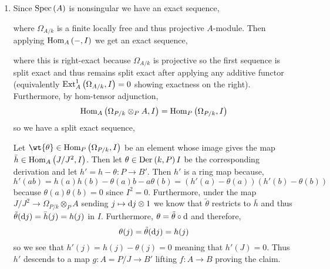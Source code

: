 \documentclass[12pt]{article}
\begin{document}
\begin{enumerate}
\item Since $\mathrm{Spec}\left( A \right)$ is nonsingular we have an exact sequence,
\begin{center}
\end{center}
where $\Omega_{A/k}$ is a finite locally free and thus projective $A$-module.
Then applying $\mathrm{Hom}_{A} \left( -, I \right)$ we get an exact sequence,
\begin{center}
\end{center}
where this is right-exact because $\Omega_{A/k}$ is projective so the first sequence is split exact and thus remains split exact after applying any additive functor (equivalently $\mathrm{Ext}^{1}_{A} \left( \Omega_{A/k}, I \right) = 0$ showing exactness on the right). Furthermore, by hom-tensor adjunction,
\[ \mathrm{Hom}_{A} \left( \Omega_{P/k} \otimes_P A, I \right) = \mathrm{Hom}_{P} \left( \Omega_{P/k}, I \right) \]
so we have a split exact sequence,
\begin{center}
\end{center}
Let $\wt{\theta} \in \Hom{P}{\Omega_{P/k}}{I}$ be an element whose image gives the map $\bar{h} \in \mathrm{Hom}_{A} \left( J/J^2, I \right)$. Then let $\theta \in \mathrm{Der}_{} \left( k, P \right){I}$ be the corresponding derivation and let $h' = h - \theta : P \to B'$. Then $h'$ is a ring map because,
\[ h'(ab) = h(a)h(b) - \theta(a) b - a \theta(b) = (h'(a) - \theta(a))(h'(b) - \theta(b)) \]
because $\theta(a) \theta(b) = 0$ since $I^2 = 0$. Furthermore, under the map $J/J^2 \to \Omega_{P/k} \otimes_P A$ sending $j \mapsto \mathrm{d}{j} \otimes 1$ we know that $\tilde{\theta}$ restricts to $\bar{h}$ and thus $\tilde{\theta}(\mathrm{d}{j}) = \bar{h}(j) = h(j)$ in $I$. Furthermore, $\theta = \tilde{\theta} \circ \mathrm{d}$ and therefore,
\[ \theta(j) = \tilde{\theta}(\mathrm{d}{j}) = h(j) \]
so we see that $h'(j) = h(j) - \theta(j) = 0$ meaning that $h'(J) = 0$. Thus $h'$ descends to a map $g : A = P/J \to B'$ lifting $f : A \to B$ proving the claim.
\end{enumerate}
\end{document}
